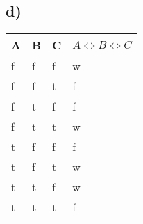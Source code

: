 \documentclass[a4paper,12pt]{article}
\begin{document}
    \subsection*{d)}
    
    \centering
    \begin{tabular}{|l|l|l|l|}
    \hline
    A & B & C & $A \iff B \iff C$ \\ \hline
    f & f & f & w \\ \hline
    f & f & t & f \\ \hline
    f & t & f & f \\ \hline
    f & t & t & w \\ \hline
    t & f & f & f \\ \hline
    t & f & t & w \\ \hline
    t & t & f & w \\ \hline
    t & t & t & f \\ \hline
    \end{tabular}
    
\end{document}
